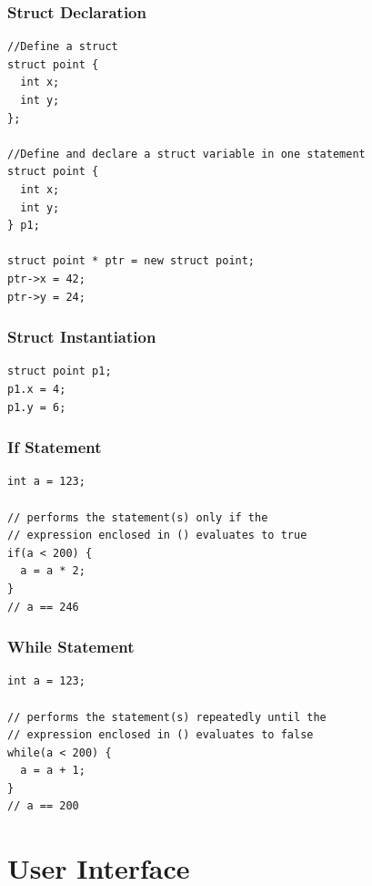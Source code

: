 \documentclass[a4paper,11pt]{article}
\begin{document}
\subsubsection{Struct Declaration}

\begin{lstlisting}
//Define a struct
struct point {
  int x;
  int y;
};

//Define and declare a struct variable in one statement
struct point {
  int x;
  int y;
} p1;

struct point * ptr = new struct point;
ptr->x = 42;
ptr->y = 24;
\end{lstlisting}

\subsubsection{Struct Instantiation}

\begin{lstlisting}
struct point p1;
p1.x = 4;
p1.y = 6;
\end{lstlisting}

\subsubsection{If Statement}

\begin{lstlisting}
int a = 123;

// performs the statement(s) only if the
// expression enclosed in () evaluates to true
if(a < 200) {
  a = a * 2;
}
// a == 246
\end{lstlisting}

\subsubsection{While Statement}

\begin{lstlisting}
int a = 123;

// performs the statement(s) repeatedly until the
// expression enclosed in () evaluates to false
while(a < 200) {
  a = a + 1;
}
// a == 200
\end{lstlisting}


\section{User Interface}
\end{document}
